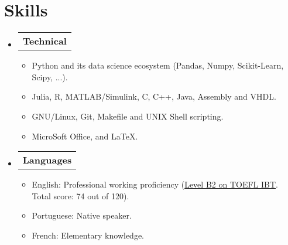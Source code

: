 \section{Skills}

\begin{itemize}[leftmargin=0.15in, label={}] %
  \item   \begin{tabular*}{0.2\textwidth}{l} \textbf{Technical} \end{tabular*}\vspace{-7pt} %
          \begin{itemize} %
            \item Python and its data science ecosystem (Pandas, Numpy, Scikit-Learn, Scipy, ...).
            \item Julia, R, MATLAB/Simulink, C, C++, Java, Assembly and VHDL.
            \item GNU/Linux, Git, Makefile and UNIX Shell scripting.
            \item MicroSoft Office, and \LaTeX.
          \end{itemize}\vspace{-5pt}
  \item   \begin{tabular*}{0.2\textwidth}{l} \textbf{Languages} \end{tabular*}\vspace{-6pt} %
          \begin{itemize}
            \item English: Professional working proficiency (\href{http://raw.githubusercontent.com/tapyu/tapyu/master/cv/Latex/figs/Toefl.pdf}{Level B2 on TOEFL IBT}. Total score: 74 out of 120).
            \item Portuguese: Native speaker.
            \item French: Elementary knowledge.
          \end{itemize}
\end{itemize} %

